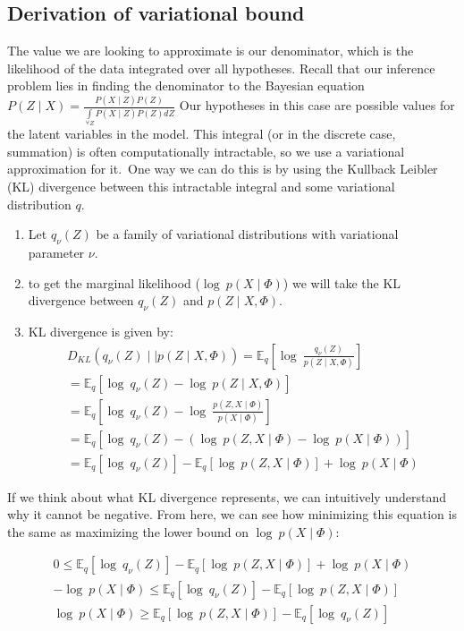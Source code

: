 \subsection{Derivation of variational bound}

The value we are looking to approximate is our denominator, which is the
likelihood of the data integrated over all hypotheses. Recall that our
inference problem lies in finding the denominator to the Bayesian
equation
$P(Z\mid X) = \frac{P(X\mid Z)P(Z)}{\int\limits_{\forall Z} P(X\mid Z) P(Z) dZ}$
Our hypotheses in this case are possible values for the latent variables
in the model. This integral (or in the discrete case, summation) is often
computationally intractable, so we use a variational approximation for
it.\
One way we can do this is by using the Kullback Leibler (KL) divergence between this
intractable integral and some variational distribution $q$.\

\begin{enumerate}
\item Let $q_\nu(Z)$ be a family of variational distributions with variational parameter $\nu$.
\item to get the marginal likelihood ($\log\ p(X\mid \Phi)$) we will take the KL divergence between $q_\nu(Z)$ and $p(Z\mid X,\Phi)$.
\item KL divergence is given by:
\begin{align}
\nonumber D_{KL}(q_\nu (Z) \mid \mid  p(Z\mid X,\Phi)) = \mathbb{E}_q[\log\ \frac{q_\nu(Z)}{p(Z\mid X,\Phi)}] \\
\nonumber  = \mathbb{E}_q [\log\ q_\nu(Z)- \log\ p(Z\mid X, \Phi)] \\
\nonumber  = \mathbb{E}_q [\log\ q_\nu(Z)- \log\ \frac{p(Z,X\mid \Phi)}{p(X\mid \Phi)}] \\
\nonumber  = \mathbb{E}_q [\log\ q_\nu(Z)- (\log\ p(Z,X\mid \Phi) - \log\ p(X\mid \Phi))] \\
 = \mathbb{E}_q [\log\ q_\nu(Z)] - \mathbb{E}_q [\log\ p(Z,X\mid \Phi)] + \log\ p(X\mid \Phi) 
\end{align}
\citep{blei:2006} 

\end{enumerate}
If we think about what KL divergence represents, we can intuitively understand why it cannot be negative. From here, we can see how minimizing this equation is the same as maximizing the lower bound on $\log\ p(X\mid \Phi)$:


\begin{align}
\nonumber 0 \leq \mathbb{E}_q [\log\ q_\nu(Z)] - \mathbb{E}_q [\log\ p(Z,X\mid \Phi)] + \log\ p(X\mid \Phi)\\
\nonumber - \log\ p(X\mid \Phi) \leq \mathbb{E}_q [\log\ q_\nu(Z)] - \mathbb{E}_q [\log\ p(Z,X\mid \Phi)]  \\
\log\ p(X\mid \Phi) \geq \mathbb{E}_q [\log\ p(Z,X\mid \Phi)] - \mathbb{E}_q [\log\ q_\nu(Z)] 
\end{align}


